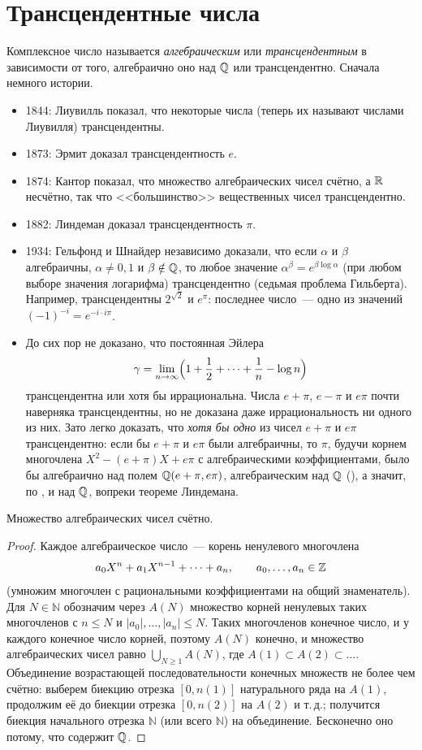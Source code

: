 \section{Трансцендентные числа}

Комплексное число называется \emph{алгебраическим} или \emph{трансцендентным} в зависимости от того, алгебраично оно над
$\mathbb Q$ или трансцендентно. Сначала немного истории.
\begin{itemize}[leftmargin=*]
\item 1844: Лиувилль показал, что некоторые числа (теперь их называют числами Лиувилля) трансцендентны.
\item 1873: Эрмит доказал трансцендентность $e$.
\item 1874: Кантор показал, что множество алгебраических чисел счётно, а $\mathbb R$ несчётно, так что <<большинство>>
вещественных чисел трансцендентно.
\item 1882: Линдеман доказал трансцендентность $\pi$.
\item 1934: Гельфонд и Шнайдер независимо доказали, что если $\alpha$ и $\beta$ алгебраичны, $\alpha\ne0,1$ и
$\beta\notin\mathbb Q$, то любое значение $\alpha^\beta=e^{\beta\log\alpha}$ (при любом выборе значения логарифма) трансцендентно
(седьмая проблема Гильберта). Например, трансцендентны $2^{\sqrt2}$ и $e^\pi$: последнее число~--- одно из значений
$(-1)^{-i}=e^{-i\cdot i\pi}$.
\item До сих пор не доказано, что постоянная Эйлера
\[
\gamma=\lim_{n\to\infty}\Bigl(1+\frac12+\dots+\frac1n-\log n\Bigr)
\]
трансцендентна или хотя бы иррациональна. Числа $e+\pi$, $e-\pi$ и $e\pi$ почти наверняка трансцендентны, но не доказана даже
иррациональность ни одного из них. Зато легко доказать, что \emph{хотя бы одно} из чисел $e+\pi$ и $e\pi$ трансцендентно: если бы $e+\pi$ и $e\pi$
были алгебраичны, то $\pi$, будучи корнем многочлена $X^2-(e+\pi)X+e\pi$ с алгебраическими коэффициентами, было бы
алгебраично над полем $\mathbb Q(e+\pi,e\pi)$, алгебраическим над $\mathbb Q$ (), а значит, по , и над $\mathbb Q$,
вопреки теореме Линдемана.
\end{itemize}

\begin{proposition}[1.33]
Множество алгебраических чисел счётно.
\end{proposition}

\begin{proof}
Каждое алгебраическое число~--- корень ненулевого многочлена
\[
a_0X^n+a_1X^{n-1}+\dots+a_n,\qquad a_0,\dots,a_n\in\mathbb Z
\]
(умножим многочлен с рациональными коэффициентами на общий знаменатель). Для $N\in\mathbb N$ обозначим через $A(N)$
множество корней ненулевых таких многочленов с $n\le N$ и $|a_0|,\dots,|a_n|\le N$. Таких многочленов конечное число,
и у каждого конечное число корней, поэтому $A(N)$ конечно, и множество алгебраических чисел равно
$\bigcup_{N\ge1}A(N)$, где $A(1)\subset A(2)\subset\dots$. Объединение возрастающей последовательности конечных множеств
не более чем счётно: выберем биекцию отрезка $[0,n(1)]$ натурального ряда на $A(1)$, продолжим её до биекции отрезка
$[0,n(2)]$ на $A(2)$ и т.\,д.; получится биекция начального отрезка $\mathbb N$ (или всего $\mathbb N$) на объединение.
Бесконечно оно потому, что содержит $\mathbb Q$.
\end{proof}

